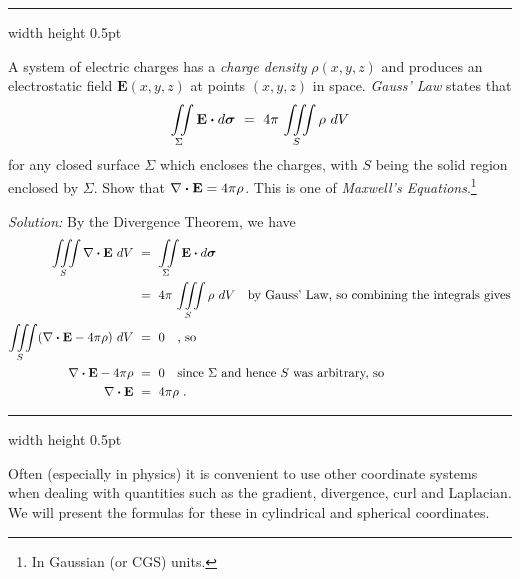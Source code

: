 \vspace{3mm}
\hrule width \textwidth height 0.5pt
\begin{exmp}
 A system of electric charges has a \emph{charge density} $\rho (x,y,z)$ and produces an electrostatic field
 $\textbf{E}(x,y,z)$ at points $(x,y,z)$ in space. \emph{Gauss' Law} states that
 \begin{displaymath}
  \iint\limits_{\Sigma} \textbf{E} \bm{\cdot} d\bm{\sigma} ~=~ 4\pi\,\iiint\limits_{S} \rho ~dV
 \end{displaymath}
 for any closed surface $\Sigma$ which encloses the charges, with $S$ being the solid region enclosed by $\Sigma$.
 Show that $\nabla \bm{\cdot} \textbf{E} = 4\pi\rho$. This is one of \emph{Maxwell's Equations}.\footnote{In Gaussian
 (or CGS) units.}\vspace{1mm}
 \par\noindent\emph{Solution:} By the Divergence Theorem, we have
 \begin{align*}
  \iiint\limits_{S} \nabla \bm{\cdot} \textbf{E} ~dV ~&=~ \iint\limits_{\Sigma} \textbf{E} \bm{\cdot} d\bm{\sigma}\\
   &=~ 4\pi\,\iiint\limits_{S} \rho ~dV \quad\text{by Gauss' Law, so combining the integrals gives}\\
   \iiint\limits_{S} ( \nabla \bm{\cdot} \textbf{E} - 4\pi\rho ) ~dV ~&=~ 0 \quad\text{, so}\\
   \nabla \bm{\cdot} \textbf{E} - 4\pi\rho ~&=~ 0 \quad\text{since $\Sigma$ and hence $S$ was arbitrary, so}\\
   \nabla \bm{\cdot} \textbf{E} ~&=~ 4\pi\rho ~.
 \end{align*}
\end{exmp}
\hrule width \textwidth height 0.5pt
\vspace{3mm}

Often (especially in physics) it is convenient to use other coordinate systems when dealing with quantities such as the
gradient, divergence, curl and Laplacian. We will present the formulas for these in cylindrical and spherical
coordinates.

